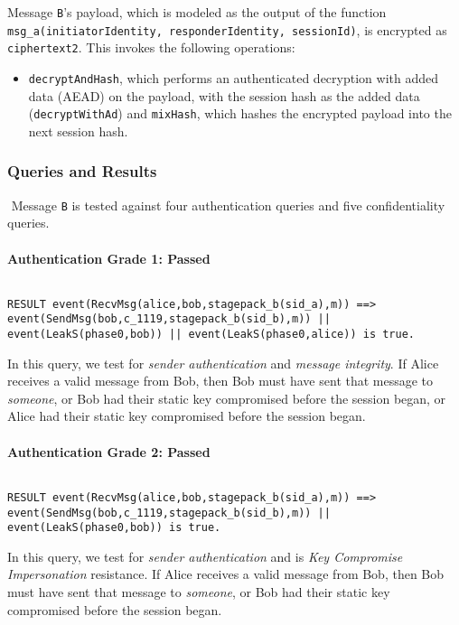 Message \texttt{B}'s payload, which is modeled as the output of the function \texttt{msg\_a(initiatorIdentity, responderIdentity, sessionId)}, is encrypted as \texttt{ciphertext2}. This invokes the following operations:


\begin{itemize}

\item \texttt{decryptAndHash}, which performs an authenticated decryption with added data (AEAD) on the payload, with the session hash as the added data (\texttt{decryptWithAd}) and \texttt{mixHash}, which hashes the encrypted payload into the next session hash.

\end{itemize}
\subsubsection{Queries and Results}$ $
Message \texttt{B} is tested against four authentication queries and five confidentiality queries.
\paragraph{Authentication Grade 1: Passed}$ $
\begin{lstlisting}
RESULT event(RecvMsg(alice,bob,stagepack_b(sid_a),m)) ==> event(SendMsg(bob,c_1119,stagepack_b(sid_b),m)) || event(LeakS(phase0,bob)) || event(LeakS(phase0,alice)) is true.
\end{lstlisting}

In this query, we test for \emph{sender authentication} and \emph{message integrity}. If Alice receives a valid message from Bob, then Bob must have sent that message to \emph{someone}, or Bob had their static key compromised before the session began, or Alice had their static key compromised before the session began.


\paragraph{Authentication Grade 2: Passed}$ $
\begin{lstlisting}
RESULT event(RecvMsg(alice,bob,stagepack_b(sid_a),m)) ==> event(SendMsg(bob,c_1119,stagepack_b(sid_b),m)) || event(LeakS(phase0,bob)) is true.
\end{lstlisting}

In this query, we test for \emph{sender authentication} and is \emph{Key Compromise Impersonation} resistance. If Alice receives a valid message from Bob, then Bob must have sent that message to \emph{someone}, or Bob had their static key compromised before the session began.


